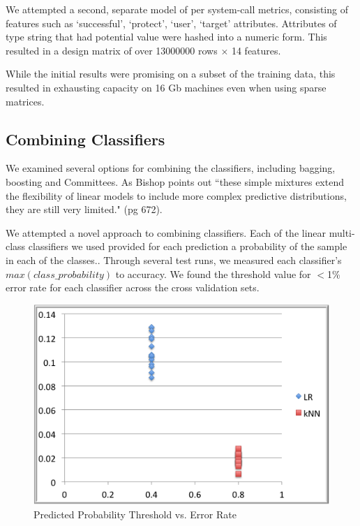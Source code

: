 \documentclass[11pt, oneside]{article}   	%
\begin{document}
We attempted a second, separate model of per system-call metrics, consisting of features such as `successful', `protect', `user', `target' attributes. Attributes of type string that had potential value were hashed into a numeric form. This resulted in a design matrix of over 13000000 rows $\times$ 14 features.

While the initial results were promising on a subset of the training data, this resulted in exhausting capacity on 16 Gb machines even when using sparse matrices.

\subsection*{Combining Classifiers}

We examined several options for combining the classifiers, including bagging, boosting and Committees. As Bishop points out ``these simple mixtures extend the flexibility of linear models to include more complex predictive distributions, they are still very limited." (pg 672).

We attempted a novel approach to combining classifiers. Each of the linear multi-class classifiers we used provided for each prediction a probability of the sample in each of the classes.\cite{sklearn}. Through several test runs, we measured each classifier's $max(class\_probability)$ to accuracy. We found the threshold value for $<$1\% error rate for each classifier across the cross validation sets. 

\begin{figure}[h!] 
  \centering
  \includegraphics[scale=0.5]{accuracy}
  \caption{Predicted Probability Threshold vs. Error Rate}
\end{figure}
\end{document}
